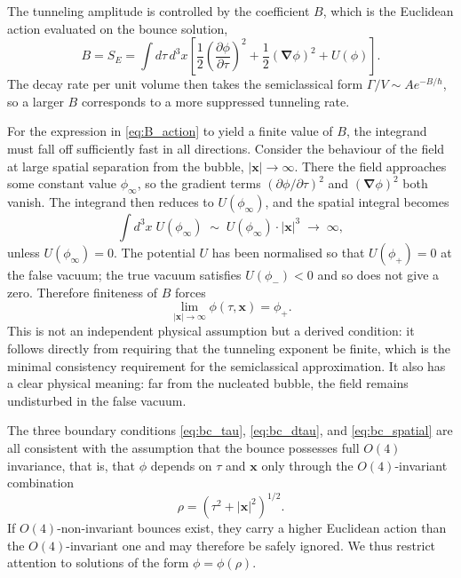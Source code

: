 The tunneling amplitude is controlled by the coefficient $B$, which is
the Euclidean action evaluated on the bounce solution,
\begin{equation}
    B = S_{E} = \int d\tau\, d^{3}x
    \left[
        \frac{1}{2}\left(\frac{\partial\phi}{\partial\tau}\right)^{2}
        +\frac{1}{2}(\boldsymbol{\nabla}\phi)^{2}
        +U(\phi)
    \right].
    \label{eq:B_action}
\end{equation}
The decay rate per unit volume then takes the semiclassical form
$\Gamma/V \sim A e^{-B/\hbar}$, so a larger $B$ corresponds to a more
suppressed tunneling rate.

For the expression in \eqref{eq:B_action} to yield a finite value of
$B$, the integrand must fall off sufficiently fast in all directions.
Consider the behaviour of the field at large spatial separation from the
bubble, $|\mathbf{x}|\to\infty$. There the field approaches some
constant value $\phi_{\infty}$, so the gradient terms
$(\partial\phi/\partial\tau)^{2}$ and $(\boldsymbol{\nabla}\phi)^{2}$
both vanish. The integrand then reduces to $U(\phi_{\infty})$, and the
spatial integral becomes
\begin{equation}
    \int d^{3}x\; U(\phi_{\infty})\;\sim\; U(\phi_{\infty})\cdot
    |\mathbf{x}|^{3}\;\longrightarrow\;\infty,
\end{equation}
unless $U(\phi_{\infty})=0$. The potential $U$ has been normalised so
that $U(\phi_{+})=0$ at the false vacuum; the true vacuum satisfies
$U(\phi_{-})<0$ and so does not give a zero. Therefore finiteness of $B$
forces
\begin{equation}
    \lim_{|\mathbf{x}|\to\infty}\phi(\tau,\mathbf{x})=\phi_{+}.
    \label{eq:bc_spatial}
\end{equation}
This is not an independent physical assumption but a derived condition:
it follows directly from requiring that the tunneling exponent be finite,
which is the minimal consistency requirement for the semiclassical
approximation. It also has a clear physical meaning: far from the
nucleated bubble, the field remains undisturbed in the false vacuum.

The three boundary conditions \eqref{eq:bc_tau}, \eqref{eq:bc_dtau},
and \eqref{eq:bc_spatial} are all consistent with the assumption that the
bounce possesses full $O(4)$ invariance, that is, that $\phi$ depends on
$\tau$ and $\mathbf{x}$ only through the $O(4)$-invariant combination
\begin{equation}
    \rho = \left(\tau^{2}+|\mathbf{x}|^{2}\right)^{1/2}.
    \label{eq:rho_def}
\end{equation}
If $O(4)$-non-invariant bounces exist, they carry a higher Euclidean
action than the $O(4)$-invariant one and may therefore be safely ignored.
We thus restrict attention to solutions of the form $\phi=\phi(\rho)$.

